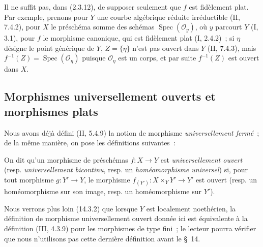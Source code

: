 \begin{remark}[2.3.15]
\label{IV.2.3.15-fr}
Il ne suffit pas, dans (2.3.12), de supposer seulement que $f$ est fidèlement
plat. Par exemple, prenons pour $Y$ une courbe algébrique réduite irréductible
(II, 7.4.2), pour $X$ le préschéma somme des schémas
$\operatorname{Spec}(\mathcal O_y)$, où $y$ parcourt $Y$ (I, 3.1), pour $f$ le
morphisme canonique, qui est fidèlement plat (I, 2.4.2)~; si $\eta$ désigne le
point générique de $Y$, $Z=\{\eta\}$ n'est pas ouvert dans $Y$ (II, 7.4.3),
mais $f^{-1}(Z)=\operatorname{Spec}(\mathcal O_\eta)$ puisque
$\mathcal O_\eta$ est un corps, et par suite $f^{-1}(Z)$ est ouvert dans $X$.
\end{remark}

\subsection{Morphismes universellement ouverts et morphismes plats}

\begin{env}[2.4.1]
\label{IV.2.4.1-fr}
Nous avons déjà défini (II, 5.4.9) la notion de morphisme
\emph{universellement fermé}~; de la même manière, on pose les définitions
suivantes~:
\end{env}

\begin{definition}[2.4.2]
\label{IV.2.4.2-fr}
On dit qu'un morphisme de préschémas $f:X\to Y$ est \emph{universellement
ouvert} (resp. \emph{universellement bicontinu}, resp. un
\emph{homéomorphisme universel}) si, pour tout morphisme $g:Y'\to Y$, le
morphisme $f_{(Y')}:X\times_Y Y'\to Y'$ est ouvert (resp. un homéomorphisme
sur son image, resp. un homéomorphisme sur $Y'$).
\end{definition}

Nous verrons plus loin (14.3.2) que lorsque $Y$ est localement noethérien, la
définition de morphisme universellement ouvert donnée ici est équivalente à la
définition (III, 4.3.9) pour les morphismes de type fini~; le lecteur pourra
vérifier que nous n'utilisons pas cette dernière définition avant le \S~14.

